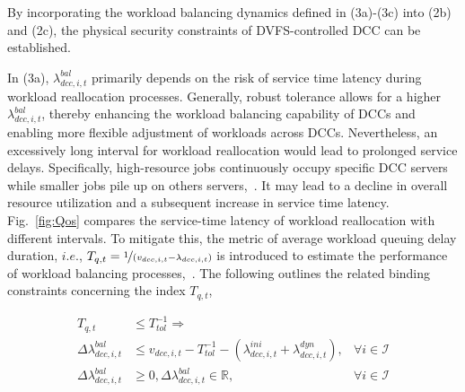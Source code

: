 \documentclass[lettersize,journal]{IEEEtran}
\begin{document}
By incorporating the workload balancing dynamics defined in (3a)-(3c) into (2b) and (2c), the physical security constraints of DVFS-controlled DCC can be established.

In (3a), $\lambda_{dcc, i,t}^{bal}$ primarily depends on the risk of service time latency during workload reallocation processes. Generally, robust tolerance allows for a higher $\lambda_{dcc, i,t}^{bal}$, thereby enhancing the workload balancing capability of DCCs and enabling more flexible adjustment of workloads across DCCs. Nevertheless, an excessively long interval for workload reallocation would lead to prolonged service delays. Specifically, high-resource jobs continuously occupy specific DCC servers while smaller jobs pile up on others servers,~\cite{dayarathna2015data}. It may lead to a decline in overall resource utilization and a subsequent increase in service time latency. Fig.~\ref{fig:Qos} compares the service-time latency of workload reallocation with different intervals. To mitigate this, the metric of average workload queuing delay duration, $i.e.$, $T_{q,t} = \nicefrac{1}{(v_{dcc,i,t} - \lambda_{dcc,i,t})}$ is introduced to estimate the performance of workload balancing processes,~\cite{bani2017scalability,wang2015proactive}. The following outlines the related binding constraints concerning the index $T_{q,t}$,

\vspace{-0.25cm}
\begin{subequations}
	\begin{align}
		\!\!\!\!T_{q,t}                           & \leq T_{tol}^{-1}\Rightarrow                                                                            &                          \\
		\!\!\!\!\varDelta \lambda_{dcc,i,t}^{bal} & \leq v_{dcc,i,t} \!-\! T_{tol}^{-1} \!-\! (\lambda_{dcc,i,t}^{ini} + \lambda_{dcc,i,t}^{dyn}), \!\!\!\! & \forall i\in \mathcal{I} \\
		\!\!\!\!\varDelta \lambda_{dcc,i,t}^{bal} & \geq 0, \varDelta \lambda_{dcc,i,t}^{bal}  \in \mathbb{R},                                              & \forall i\in \mathcal{I}
	\end{align}
\end{subequations}
\end{document}
